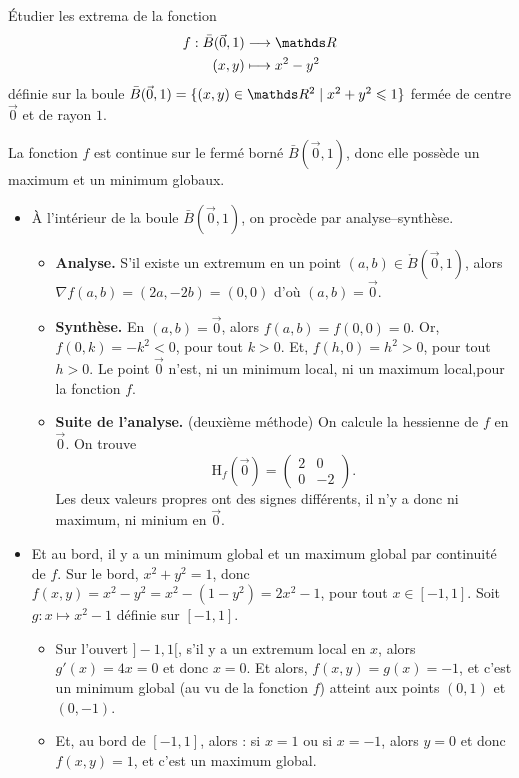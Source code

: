 \begin{exo}
	\begin{slshape}
		Étudier les extrema de la fonction \begin{align*}
			f: \bar{B}(\vec{0}, 1) &\longrightarrow \R \\
			(x,y) &\longmapsto x^2-y^2
		\end{align*}
		définie sur la boule $\bar{B}(\vec{0}, 1) = \{(x,y)\in \R^2  \mid x^2 + y^2 \le 1\}$ fermée de centre $\vec{0}$ et de rayon $1$.
	\end{slshape}

	La fonction $f$ est continue sur le fermé borné $\bar{B}(\vec{0}, 1)$, donc elle possède un maximum et un minimum globaux.
	\begin{itemize}
		\item À l'intérieur de la boule $\bar{B}(\vec{0}, 1)$, on procède par analyse--synthèse.
			\begin{itemize}
				\item \textbf{Analyse.} S'il existe un extremum en un point $(a,b) \in \mathring B(\vec{0}, 1)$, alors $\nabla f(a,b) = (2a, -2b) = (0,0)$ d'où $(a,b) = \vec{0}$.
				\item \textbf{Synthèse.} En $(a,b) = \vec{0}$, alors $f(a,b) = f(0,0) = 0$.
					Or, $f(0, k) = -k^2 < 0$, pour tout $k > 0$.
					Et, $f(h, 0) = h^2 > 0$, pour tout $h > 0$.
					Le point $\vec{0}$ n'est, ni un minimum local, ni un maximum local,pour la fonction $f$.
				\item \textbf{Suite de l'analyse.} (deuxième méthode)
					On calcule la hessienne de $f$ en $\vec{0}$. On trouve \[
						\mathrm{H}_f(\vec{0}) = \begin{pmatrix}
							2 & 0\\
							0 & -2
						\end{pmatrix}
					.\]
					Les deux valeurs propres ont des signes différents, il n'y a donc ni maximum, ni minium en $\vec{0}$.
			\end{itemize}
		\item Et au bord, il y a un minimum global et un maximum global par continuité de $f$.
			Sur le bord, $x^2 + y^2 = 1$, donc $f(x,y) = x^2 - y^2 = x^2 - (1 - y^2) = 2x^2 - 1$, pour tout $x \in [-1,1]$.
			Soit $g : x \mapsto x^2 - 1$ définie sur $[-1,1]$.
			\begin{itemize}
				\item Sur l'ouvert $]-1,1[$, s'il y a un extremum local en $x$, alors $g'(x) = 4x = 0$ et donc $x = 0$.
					Et alors, $f(x,y) = g(x) = -1$, et c'est un minimum global (au vu de la fonction $f$) atteint aux points $(0, 1)$ et $(0, -1)$.
				\item Et, au bord de $[-1,1]$, alors : si $x = 1$ ou si $x = -1$, alors $y = 0$ et donc $f(x,y) = 1$, et c'est un maximum global.
			\end{itemize}
	\end{itemize}
\end{exo}

